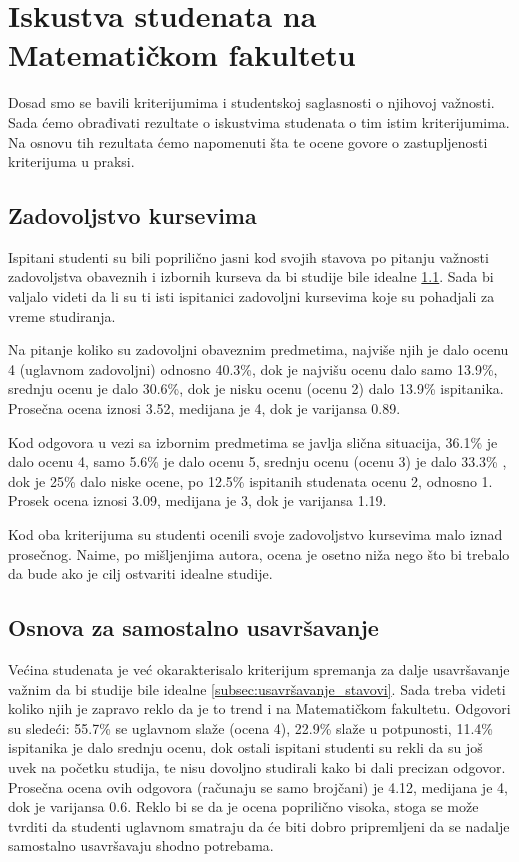 \documentclass[a4paper]{article}
\begin{document}
{\section{Iskustva studenata na Matematičkom fakultetu}
\label{sec:iskustva}

Dosad smo se bavili kriterijumima i studentskoj saglasnosti o njihovoj važnosti. Sada ćemo obrađivati rezultate o iskustvima studenata o tim istim kriterijumima. Na osnovu tih rezultata ćemo napomenuti šta te ocene govore o zastupljenosti kriterijuma u praksi.  

\subsection{Zadovoljstvo kursevima}
\label{subsec:zadovoljstvo_iskustva}
Ispitani studenti su bili poprilično jasni kod svojih stavova po pitanju važnosti zadovoljstva obaveznih i izbornih kurseva da bi studije bile idealne \ref{subsec:zadovoljstvo_iskustva}. Sada bi valjalo videti da li su ti isti ispitanici zadovoljni kursevima koje su pohadjali za vreme studiranja.

Na pitanje koliko su zadovoljni obaveznim predmetima, najviše njih je dalo ocenu 4 (uglavnom zadovoljni) odnosno 40.3\%, dok je najvišu ocenu dalo samo 13.9\%, srednju ocenu je dalo 30.6\%, dok je nisku ocenu (ocenu 2) dalo 13.9\% ispitanika. Prosečna ocena iznosi 3.52, medijana je 4, dok je varijansa 0.89.

Kod odgovora u vezi sa izbornim predmetima se javlja slična situacija, 36.1\% je dalo ocenu 4, samo 5.6\% je dalo ocenu 5, srednju ocenu (ocenu 3) je dalo 33.3\% , dok je 25\% dalo niske ocene, po 12.5\% ispitanih studenata ocenu 2, odnosno 1. Prosek ocena iznosi 3.09, medijana je 3, dok je varijansa 1.19. 

Kod oba kriterijuma su studenti ocenili svoje zadovoljstvo kursevima malo iznad prosečnog. Naime, po mišljenjima autora, ocena je osetno niža nego što bi trebalo da bude ako je cilj ostvariti idealne studije.

\subsection{Osnova za samostalno usavršavanje}
\label{subsec:usavršavanje_iskustva}
Većina studenata je već okarakterisalo kriterijum spremanja za dalje usavršavanje važnim da bi studije bile idealne \ref{subsec:usavršavanje_stavovi}. Sada treba videti koliko njih je zapravo reklo da je to trend i na Matematičkom fakultetu.
Odgovori su sledeći: 55.7\%  se uglavnom slaže (ocena 4), 22.9\% slaže u potpunosti,  11.4\%  ispitanika je dalo srednju ocenu, dok ostali ispitani studenti su rekli da su još uvek na početku studija, te nisu dovoljno studirali kako bi dali precizan odgovor. Prosečna ocena ovih odgovora (računaju se samo brojčani) je  4.12, medijana je 4, dok je varijansa 0.6. Reklo bi se da je ocena poprilično visoka, stoga se može tvrditi da studenti uglavnom smatraju da će biti dobro pripremljeni da se nadalje samostalno usavršavaju shodno potrebama.


}
\end{document}
